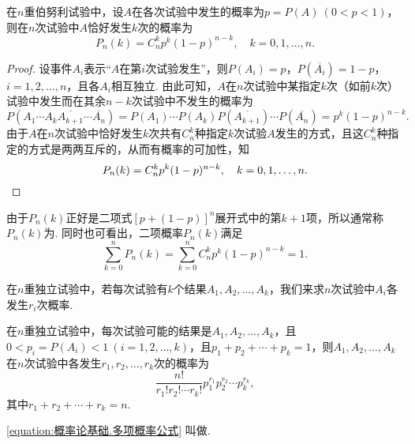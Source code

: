 \begin{theorem}[二项概率]
在\(n\)重伯努利试验中，设\(A\)在各次试验中发生的概率为\(p = P(A)\ (0 < p < 1)\)，则在\(n\)次试验中\(A\)恰好发生\(k\)次的概率为\begin{equation}
P_n(k) = C_n^k p^k (1-p)^{n-k}, \quad k=0,1,\dotsc,n.
\end{equation}
\begin{proof}
设事件\(A_i\)表示“\(A\)在第\(i\)次试验发生”，则\(P(A_i)=p\)，\(P(\overline{A_i})=1-p\)，\(i=1,2,\dotsc,n\)，且各\(A_i\)相互独立.
由此可知，\(A\)在\(n\)次试验中某指定\(k\)次（如前\(k\)次）试验中发生而在其余\(n-k\)次试验中不发生的概率为\[
P(A_1 \dotsm A_k \overline{A_{k+1}} \dotsm \overline{A_n})
= P(A_1) \dotsm P(A_k) P(\overline{A_{k+1}}) \dotsm P(\overline{A_n})
= p^k (1-p)^{n-k}.
\]由于\(A\)在\(n\)次试验中恰好发生\(k\)次共有\(C_n^k\)种指定\(k\)次试验\(A\)发生的方式，且这\(C_n^k\)种指定的方式是两两互斥的，从而有概率的可加性，知\[
P_n(k) = C_n^k p^k (1-p)^{n-k},
\quad k=0,1,\dotsc,n.
\qedhere
\]
\end{proof}
\end{theorem}
由于\(P_n(k)\)正好是二项式\([p+(1-p)]^n\)展开式中的第\(k+1\)项，所以通常称\(P_n(k)\)为.
同时也可看出，二项概率\(P_n(k)\)满足\begin{equation}
\sum\limits_{k=0}^n P_n(k)
= \sum\limits_{k=0}^n C_n^k p^k (1-p)^{n-k} = 1.
\end{equation}

在\(n\)重独立试验中，若每次试验有\(k\)个结果\(A_1,A_2,\dotsc,A_k\)，我们来求\(n\)次试验中\(A_i\)各发生\(r_i\)次概率.

\begin{theorem}[多项概率]
在\(n\)重独立试验中，每次试验可能的结果是\(A_1,A_2,\dotsc,A_k\)，且\(0 < p_i = P(A_i) < 1\ (i=1,2,\dotsc,k)\)，且\(p_1+p_2+\dotsb+p_k=1\)，则\(A_1,A_2,\dotsc,A_k\)在\(n\)次试验中各发生\(r_1,r_2,\dotsc,r_k\)次的概率为\begin{equation}\label{equation:概率论基础.多项概率公式}
\frac{n!}{r_1! r_2! \dotsm r_k!} p_1^{r_1} p_2^{r_2} \dotsm p_k^{r_k},
\end{equation}其中\(r_1+r_2+\dotsb+r_k=n\).
\end{theorem}
\cref{equation:概率论基础.多项概率公式} 叫做.

